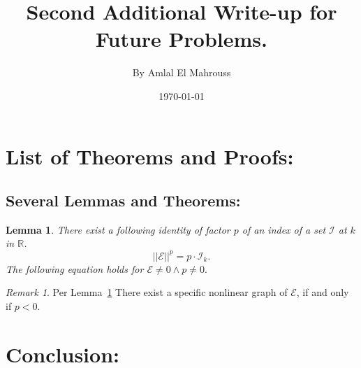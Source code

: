 \documentclass[10pt]{article}
\title{%
	\vspace{-1.5em}%
	\large\textbf{Second Additional Write-up for Future Problems.}%
}
\author{By Amlal El Mahrouss}
\date{\today}
\theoremstyle{plain}
\newtheorem{lemma}[theorem]{Lemma}
\theoremstyle{definition}
\theoremstyle{remark}
\newtheorem{remark}[theorem]{Remark}
\begin{document}

\maketitle
\tableofcontents
\newpage

\section{List of Theorems and Proofs:}

\subsection{Several Lemmas and Theorems:}

\begin{lemma}
\label{lem:1}
There exist a following identity of factor $p$ of an index of a set $\mathcal{I}$ at $k$ in $\mathbb{R}$.
\begin{equation}
	||\mathcal{E}||^{p} = p \cdot \mathcal{I}_{k}.
\end{equation}
The following equation holds for $\mathcal{E} \neq 0 \land p \neq 0.$
\end{lemma}
\begin{remark}
Per Lemma~\ref{lem:1} There exist a specific nonlinear graph of $\mathcal{E}$, if and only if $p < 0$.
\end{remark}

\section{Conclusion:}

\end{document}
